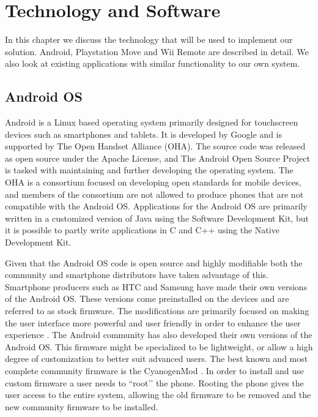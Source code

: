 \chapter{Technology and Software}
In this chapter we discuss the technology that will be used to implement our solution. Android, Playstation Move and Wii Remote are described in detail. We also look at existing applications with similar functionality to our own system. 

\section{Android OS}
Android is a Linux based operating system primarily designed for touchscreen devices such as smartphones and tablets. It is developed by Google and is supported by The Open Handset Alliance (OHA). The source code was released as open source under the Apache License, and The Android Open Source Project is tasked with maintaining and further developing the operating system. The OHA is a consortium focused on developing open standards for mobile devices, and members of the consortium are not allowed to produce phones that are not compatible with the Android OS. Applications for the Android OS are primarily written in a customized version of Java using the Software Development Kit, but it is possible to partly write applications in C and C++ using the Native Development Kit. 

Given that the Android OS code is open source and highly modifiable both the community and smartphone distributors have taken advantage of this. Smartphone producers such as HTC and Samsung have made their own versions of the Android OS. These versions come preinstalled on the devices and are referred to as stock firmware. The modifications are primarily focused on making the user interface more powerful and user friendly in order to enhance the user experience \cite{htcSense}. The Android community has also developed their own versions of the Android OS. This firmware might be specialized to be lightweight, or allow a high degree of customization to better suit advanced users. The best known and most complete community firmware is the CyanogenMod \cite{cyanogenMod}. In order to install and use custom firmware a user needs to ``root’’ the phone. Rooting the phone gives the user access to the entire system, allowing the old firmware to be removed and the new community firmware to be installed.

